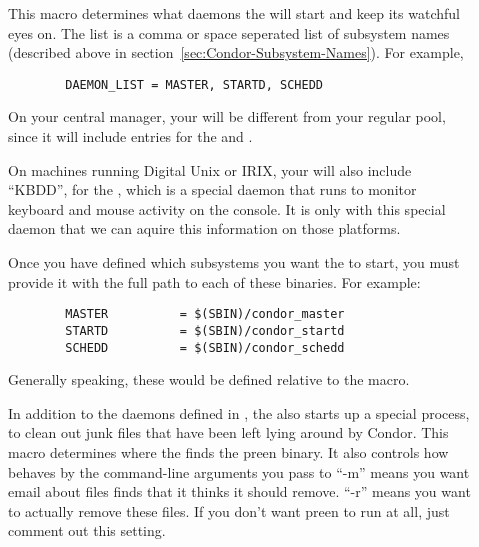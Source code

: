 \begin{description}
  
\item[] \label{param:DaemonList} This macro
  determines what daemons the  will start and keep its
  watchful eyes on.  The list is a comma or space seperated list of
  subsystem names (described above in
  section~\ref{sec:Condor-Subsystem-Names}).  For example,

\begin{verbatim}
        DAEMON_LIST = MASTER, STARTD, SCHEDD
\end{verbatim}

  \Note On your central manager, your 
  will be different from your regular pool, since it will include
  entries for the  and .  
  
  \Note On machines running Digital Unix or IRIX, your
   will also include ``KBDD'', for the
  , which is a special daemon that runs to monitor
  keyboard and mouse activity on the console.  It is only with this
  special daemon that we can aquire this information on those
  platforms. 

\item[] \label{param:SUBSYS} Once you have defined which
  subsystems you want the  to start, you must provide
  it with the full path to each of these binaries.  For example:

\begin{verbatim}
        MASTER          = $(SBIN)/condor_master
        STARTD          = $(SBIN)/condor_startd
        SCHEDD          = $(SBIN)/condor_schedd
\end{verbatim}

  Generally speaking, these would be defined relative to the
   macro.
  
\item[] \label{param:Preen} In addition to the daemons
  defined in , the  also starts up
  a special process,  to clean out junk files that have
  been left lying around by Condor.  This macro determines where the
   finds the preen binary.  It also controls how
   behaves by the command-line arguments you pass to
  ``-m'' means you want email about files  finds that it
  thinks it should remove.  ``-r'' means you want  to
  actually remove these files.  If you don't want preen to run at all,
  just comment out this setting.


\end{description}
